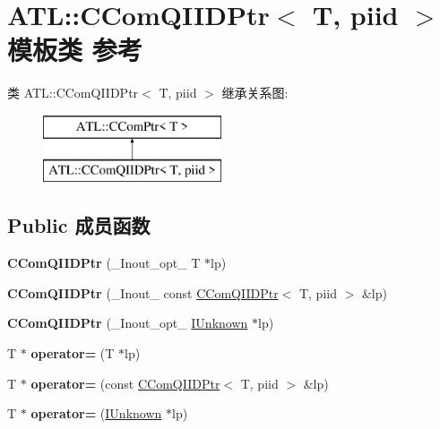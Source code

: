 \hypertarget{class_a_t_l_1_1_c_com_q_i_i_d_ptr}{}\section{A\+TL\+:\+:C\+Com\+Q\+I\+I\+D\+Ptr$<$ T, piid $>$ 模板类 参考}
\label{class_a_t_l_1_1_c_com_q_i_i_d_ptr}
类 A\+TL\+:\+:C\+Com\+Q\+I\+I\+D\+Ptr$<$ T, piid $>$ 继承关系图\+:\begin{figure}[H]
\begin{center}
\leavevmode
\includegraphics[height=2.000000cm]{class_a_t_l_1_1_c_com_q_i_i_d_ptr}
\end{center}
\end{figure}
\subsection*{Public 成员函数}
\begin{DoxyCompactItemize}
\item 
\mbox{\label{class_a_t_l_1_1_c_com_q_i_i_d_ptr_a285ae76ddb2b57da99533000ed6d4259}} 
{\bfseries C\+Com\+Q\+I\+I\+D\+Ptr} (\+\_\+\+Inout\+\_\+opt\+\_\+ T $\ast$lp)
\item 
\mbox{\label{class_a_t_l_1_1_c_com_q_i_i_d_ptr_a7bfb6191c805e9072a018d5efdeb54c7}} 
{\bfseries C\+Com\+Q\+I\+I\+D\+Ptr} (\+\_\+\+Inout\+\_\+ const \hyperlink{class_a_t_l_1_1_c_com_q_i_i_d_ptr}{C\+Com\+Q\+I\+I\+D\+Ptr}$<$ T, piid $>$ \&lp)
\item 
\mbox{\label{class_a_t_l_1_1_c_com_q_i_i_d_ptr_a85d4c23d2e42b6f0fd9c39c4e5793a40}} 
{\bfseries C\+Com\+Q\+I\+I\+D\+Ptr} (\+\_\+\+Inout\+\_\+opt\+\_\+ \hyperlink{interface_i_unknown}{I\+Unknown} $\ast$lp)
\item 
\mbox{\label{class_a_t_l_1_1_c_com_q_i_i_d_ptr_ae53ae8f47a1927930de0c9c9cc68f339}} 
T $\ast$ {\bfseries operator=} (T $\ast$lp)
\item 
\mbox{\label{class_a_t_l_1_1_c_com_q_i_i_d_ptr_a12de8d17de4705f6efa339b8e6313964}} 
T $\ast$ {\bfseries operator=} (const \hyperlink{class_a_t_l_1_1_c_com_q_i_i_d_ptr}{C\+Com\+Q\+I\+I\+D\+Ptr}$<$ T, piid $>$ \&lp)
\item 
\mbox{\label{class_a_t_l_1_1_c_com_q_i_i_d_ptr_a7a303bf7f7f6fa668179d08d235e36c7}} 
T $\ast$ {\bfseries operator=} (\hyperlink{interface_i_unknown}{I\+Unknown} $\ast$lp)
\end{DoxyCompactItemize}
